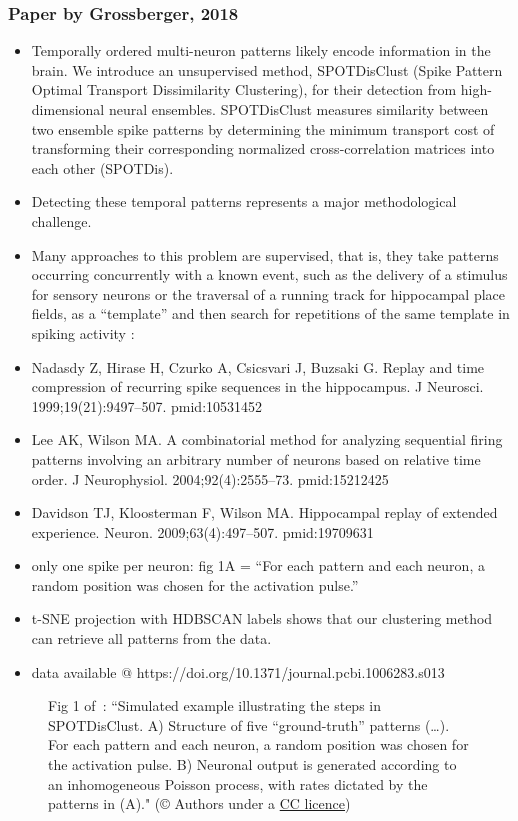 \documentclass[brainsci, %
               review,submit,pdftex,moreauthors%
               ]{Definitions/mdpi}
\begin{document}
\subsubsection{Paper by Grossberger, 2018~\citep{grossberger_unsupervised_2018}}
\begin{itemize}
 \item
  Temporally ordered multi-neuron patterns likely encode information in the brain. We introduce an unsupervised method, SPOTDisClust (Spike Pattern Optimal Transport Dissimilarity Clustering), for their detection from high-dimensional neural ensembles. SPOTDisClust measures similarity between two ensemble spike patterns by determining the minimum transport cost of transforming their corresponding normalized cross-correlation matrices into each other (SPOTDis).
\item
  Detecting these temporal patterns represents a major methodological challenge.
\item
  Many approaches to this problem are supervised, that is, they take patterns occurring concurrently with a known event, such as the delivery of a stimulus for sensory neurons or the traversal of a running track for hippocampal place fields, as a ``template'' and then search for repetitions of the same template in spiking activity :
\item
  Nadasdy Z, Hirase H, Czurko A, Csicsvari J, Buzsaki G. Replay and time compression of recurring spike sequences in the hippocampus. J Neurosci. 1999;19(21):9497--507. pmid:10531452
\item
  Lee AK, Wilson MA. A combinatorial method for analyzing sequential firing patterns involving an arbitrary number of neurons based on relative time order. J Neurophysiol. 2004;92(4):2555--73. pmid:15212425
\item
  Davidson TJ, Kloosterman F, Wilson MA. Hippocampal replay of extended experience. Neuron. 2009;63(4):497--507. pmid:19709631
\item
  only one spike per neuron: fig 1A = ``For each pattern and each neuron, a random position was chosen for the activation pulse.''
\item
  t-SNE projection with HDBSCAN labels shows that our clustering method can retrieve all patterns from the data.
\item
  data available @ https://doi.org/10.1371/journal.pcbi.1006283.s013
\end{itemize}

\begin{figure}
\centering
\caption{Fig 1 of~\citep{grossberger_unsupervised_2018}: ``Simulated example illustrating the steps in SPOTDisClust. A) Structure of five ``ground-truth'' patterns (\ldots). For each pattern and each neuron, a random position was chosen for the activation pulse. B) Neuronal output is generated according to an inhomogeneous Poisson process, with rates dictated by the patterns in (A)." (© Authors under a \href{https://journals.plos.org/ploscompbiol/article?id=10.1371/journal.pcbi.1006283}{CC licence})}\label{fig:G2018-1}
\end{figure}
\end{document}
